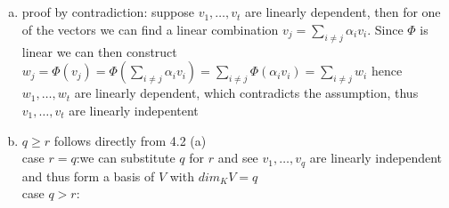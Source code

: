 \documentclass[a4paper,10pt]{article}
\begin{document}
\subsection{}
\label{sec:five}

\begin{enumerate}[(a)]
	\item proof by contradiction: suppose $v_1,\dots,v_t$ are linearly dependent, then for one of the vectors we can find a linear combination $ v_j=\sum_{i\neq j} \alpha_i v_i$. Since $\Phi$ is linear we can then construct $ w_j=\Phi(v_j)=\Phi(\sum_{i\neq j}\alpha _iv_i)=\sum_{i\neq j}\Phi(\alpha _i v_i)=\sum_{i\neq j} w_i$ hence $w_1,\dots,w_t$ are linearly dependent, which contradicts the assumption, thus $v_1,\dots,v_t$ are linearly indepentent
	\item $ q \geq r$ follows directly from 4.2 (a)\\
		case $r=q$:we can substitute $q$ for $r$ and see $v_1,\dots,v_q$ are linearly independent and thus form a basis of $V$ with $dim_K V=q$\\
		case $q>r$:
\end{enumerate}
\end{document}
